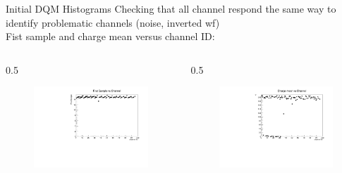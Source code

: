 \documentclass{beamer}[10pt]
\begin{document}
\begin{frame}{Initial DQM Histograms}
Checking that all channel respond the same way to identify problematic channels (noise, inverted wf) 
\\
Fist sample and charge mean versus channel ID:
\begin{columns}
\begin{column}{0.5\framewidth}
\begin{figure}[H]
   \centering
   \includegraphics[width= .90\columnwidth]{figures/pdf/fs_vs_ch.pdf}
   \label{fig:wffytl}
 \end{figure}
\end{column}
\begin{column}{0.5\framewidth}
\begin{figure}[H]
   \centering
   \includegraphics[width= .90\columnwidth]{figures/pdf/q_vs_ch.pdf}
   \label{fig:wffytl}
 \end{figure}
\end{column}
\end{columns}
\end{frame}
\end{document}
